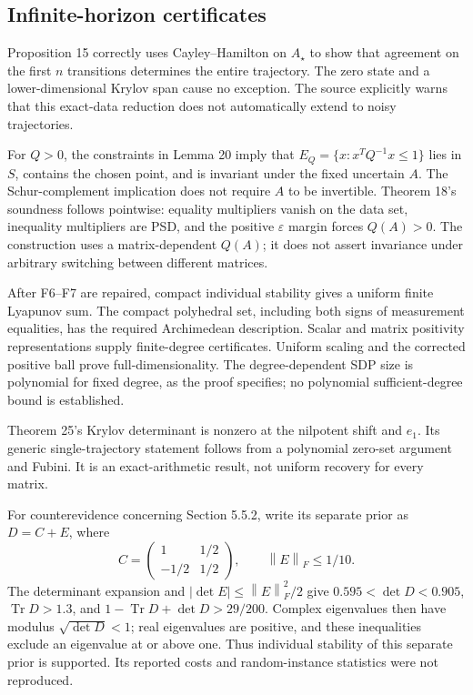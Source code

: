 \documentclass[10pt]{article}
\begin{document}
\subsection*{Infinite-horizon certificates}
Proposition 15 correctly uses Cayley–Hamilton on \(A_\star\) to show that agreement on the first \(n\) transitions determines the entire trajectory. The zero state and a lower-dimensional Krylov span cause no exception. The source explicitly warns that this exact-data reduction does not automatically extend to noisy trajectories.\par
For \(Q>0\), the constraints in Lemma 20 imply that \(E_Q=\{x:x^TQ^{-1}x\le1\}\) lies in \(S\), contains the chosen point, and is invariant under the fixed uncertain \(A\). The Schur-complement implication does not require \(A\) to be invertible. Theorem 18’s soundness follows pointwise: equality multipliers vanish on the data set, inequality multipliers are PSD, and the positive \(\varepsilon\) margin forces \(Q(A)>0\). The construction uses a matrix-dependent \(Q(A)\); it does not assert invariance under arbitrary switching between different matrices.\par
After F6–F7 are repaired, compact individual stability gives a uniform finite Lyapunov sum. The compact polyhedral set, including both signs of measurement equalities, has the required Archimedean description. Scalar and matrix positivity representations supply finite-degree certificates. Uniform scaling and the corrected positive ball prove full-dimensionality. The degree-dependent SDP size is polynomial for fixed degree, as the proof specifies; no polynomial sufficient-degree bound is established.\par
Theorem 25’s Krylov determinant is nonzero at the nilpotent shift and \(e_1\). Its generic single-trajectory statement follows from a polynomial zero-set argument and Fubini. It is an exact-arithmetic result, not uniform recovery for every matrix.\par
For counterevidence concerning Section 5.5.2, write its separate prior as \(D=C+E\), where \[C=\begin{pmatrix}1&1/2\\-1/2&1/2\end{pmatrix},
 \qquad \left\lVert E\right\rVert_F\le1/10.\] The determinant expansion and \(|\det E|\le\left\lVert E\right\rVert_F^2/2\) give \(0.595<\det D<0.905\), \(\operatorname{Tr}D>1.3\), and \(1-\operatorname{Tr}D+\det D>29/200\). Complex eigenvalues then have modulus \(\sqrt{\det D}<1\); real eigenvalues are positive, and these inequalities exclude an eigenvalue at or above one. Thus individual stability of this separate prior is supported. Its reported costs and random-instance statistics were not reproduced.\par
\end{document}
